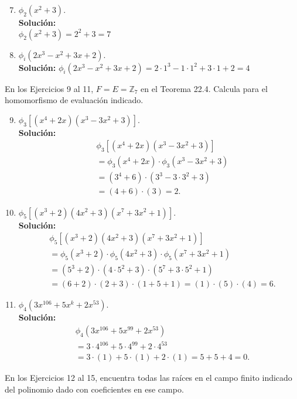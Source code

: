 \begin{enumerate}
	\setcounter{enumi}{6}
	\item $\phi_2(x^2 + 3) $.
	\\ \textbf{Solución:} \\
	$\phi_2(x^2 + 3) = 2^2 + 3 = 7$
	\item $\phi_i(2x^3 - x^2 + 3x + 2)$.
	\\ \textbf{Solución:}
	$\phi_i(2x^3 - x^2 + 3x + 2) = 2 \cdot 1^3 - 1 \cdot 1^2 + 3 \cdot 1 + 2 = 4$
\end{enumerate}
\noindent
En los Ejercicios 9 al 11, $F = E = \mathbb{Z}_7$ en el Teorema 22.4. Calcula para el homomorfismo de evaluación indicado.
\begin{enumerate}
	\setcounter{enumi}{8}
	\item $\phi_3[(x^4 + 2x)(x^3 - 3x^2 + 3)]$.
	\\ \textbf{Solución:} 
	\begin{align*}
		& \phi_3[(x^4 + 2x)(x^3 - 3x^2 + 3)] \\
		& = \phi_3(x^4 + 2x) \cdot \phi_3(x^3 - 3x^2 + 3) \\
		& = (3^4 + 6) \cdot (3^3 - 3 \cdot 3^2 + 3) \\
		& = (4 + 6) \cdot (3) = 2.
	\end{align*}
	\item $\phi_5[(x^3 + 2)(4x^2 + 3)(x^7 + 3x^2 + 1)]$.
	\\ \textbf{Solución:} 
	\begin{align*}
		&  \phi_5[(x^3 + 2)(4x^2 + 3)(x^7 + 3x^2 + 1)] \\
		&= \phi_5(x^3 + 2) \cdot \phi_5(4x^2 + 3) \cdot \phi_5(x^7 + 3x^2 + 1) \\
		& = (5^3 + 2) \cdot (4 \cdot 5^2 + 3) \cdot (5^7 + 3 \cdot 5^2 + 1) \\
		& = (6 + 2) \cdot (2 + 3) \cdot (1 + 5 + 1) = (1) \cdot (5) \cdot (4) = 6.
	\end{align*}
	\item $\phi_4(3x^{106} + 5x^k + 2x^{53})$.
	\\ \textbf{Solución:}
	\begin{align*}
		&\phi_4(3x^{106} + 5x^{99} + 2x^{53}) \\
		&= 3 \cdot 4^{106} + 5 \cdot 4^{99} + 2 \cdot 4^{53} \\
		&= 3 \cdot (1) + 5 \cdot (1) + 2 \cdot (1) = 5 + 5 + 4 = 0.
	\end{align*}
\end{enumerate}
\noindent
En los Ejercicios 12 al 15, encuentra todas las raíces en el campo finito indicado del polinomio dado con coeficientes en ese campo.
